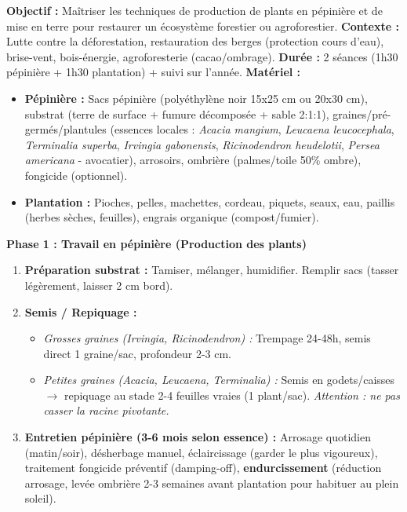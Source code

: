 \documentclass[11pt]{article}
\begin{document}
\begin{experience}
\textbf{Objectif :} Maîtriser les techniques de production de plants en pépinière et de mise en terre pour restaurer un écosystème forestier ou agroforestier.
\textbf{Contexte :} Lutte contre la déforestation, restauration des berges (protection cours d'eau), brise-vent, bois-énergie, agroforesterie (cacao/ombrage).
\textbf{Durée :} 2 séances (1h30 pépinière + 1h30 plantation) + suivi sur l'année.
\textbf{Matériel :}
\begin{itemize}
    \item \textbf{Pépinière :} Sacs pépinière (polyéthylène noir 15x25 cm ou 20x30 cm), substrat (terre de surface + fumure décomposée + sable 2:1:1), graines/pré-germés/plantules (essences locales : \emph{Acacia mangium}, \emph{Leucaena leucocephala}, \emph{Terminalia superba}, \emph{Irvingia gabonensis}, \emph{Ricinodendron heudelotii}, \emph{Persea americana} - avocatier), arrosoirs, ombrière (palmes/toile 50\% ombre), fongicide (optionnel).
    \item \textbf{Plantation :} Pioches, pelles, machettes, cordeau, piquets, seaux, eau, paillis (herbes sèches, feuilles), engrais organique (compost/fumier).
\end{itemize}

\textbf{Phase 1 : Travail en pépinière (Production des plants)}
\begin{enumerate}
    \item \textbf{Préparation substrat :} Tamiser, mélanger, humidifier. Remplir sacs (tasser légèrement, laisser 2 cm bord).
    \item \textbf{Semis / Repiquage :}
    \begin{itemize}
        \item \emph{Grosses graines (Irvingia, Ricinodendron) :} Trempage 24-48h, semis direct 1 graine/sac, profondeur 2-3 cm.
        \item \emph{Petites graines (Acacia, Leucaena, Terminalia) :} Semis en godets/caisses $\to$ repiquage au stade 2-4 feuilles vraies (1 plant/sac). \emph{Attention : ne pas casser la racine pivotante.}
    \end{itemize}
    \item \textbf{Entretien pépinière (3-6 mois selon essence) :} Arrosage quotidien (matin/soir), désherbage manuel, éclaircissage (garder le plus vigoureux), traitement fongicide préventif (damping-off), \textbf{endurcissement} (réduction arrosage, levée ombrière 2-3 semaines avant plantation pour habituer au plein soleil).
\end{enumerate}


\end{experience}
\end{document}
